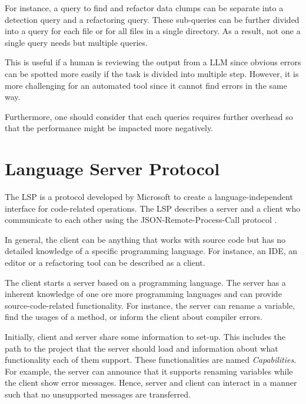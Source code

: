 For instance, a query to find and refactor data clumps can be separate into a detection query and a refactoring query. These sub-queries can be further divided into a query for each file or for all files in a single directory. As a result, not one a single query needs but multiple queries. 

This is useful if a human is reviewing the output from a \ac{LLM} since obvious errors can be spotted more easily if the task is divided into multiple  step. However, it is more challenging for an automated tool since it cannot find errors in the same way. 

Furthermore, one should consider that each queries requires further overhead so that the performance might be impacted more negatively. 
\section{Language Server Protocol} \label{sec:lsp}
The \ac{LSP}  \cite{lsp_website} is a protocol developed by Microsoft to create a language-independent interface for code-related operations. 
The \ac{LSP}  describes a server and a client who communicate to each other using the JSON-Remote-Process-Call protocol \cite{json_rpc}. 

In general, the client can be anything that works with source code but has no detailed knowledge of a specific programming language. For instance, an \ac{IDE}, an editor or a refactoring tool can be described as a client.

The client starts a server based on a programming language. The server has a inherent knowledge of one ore more programming languages and can provide source-code-related functionality. For instance, the server can rename a variable, find the usages of a method, or inform the client about compiler errors. 

Initially, client and server share some information to set-up. This includes the path to the project that the server should load and information about what functionality each of them support. These functionalities are named \textit{Capabilities}. For example, the server can announce that it supports renaming variables while the client show error messages. Hence, server and client can interact in a manner such that no unsupported messages are transferred.

